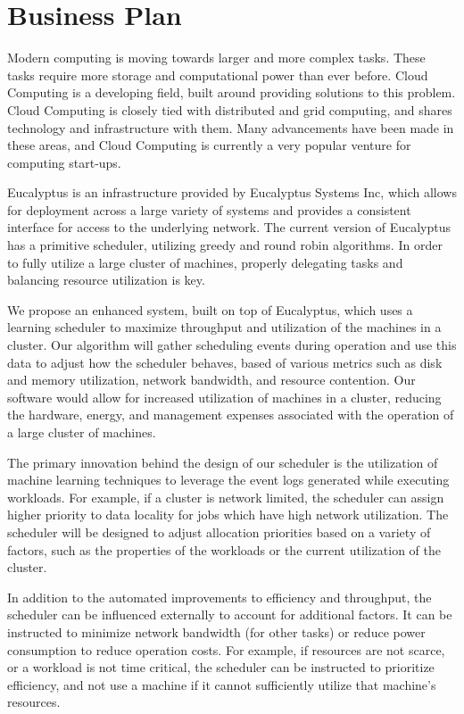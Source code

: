 \section{Business Plan}
  Modern computing is moving towards larger and more complex tasks.  These tasks require more storage and computational power than ever before.  Cloud Computing is a developing field, built around providing solutions to this problem.  Cloud Computing is closely tied with distributed and grid computing, and shares technology and infrastructure with them.  Many advancements have been made in these areas, and Cloud Computing is currently a very popular venture for computing start-ups.

  Eucalyptus is an infrastructure provided by Eucalyptus Systems Inc, which allows for deployment across a large variety of systems and provides a consistent interface for access to the underlying network.  The current version of Eucalyptus has a primitive scheduler, utilizing greedy and round robin algorithms.  In order to fully utilize a large cluster of machines, properly delegating tasks and balancing resource utilization is key.

  We propose an enhanced system, built on top of Eucalyptus, which uses a learning scheduler to maximize throughput and utilization of the machines in a cluster.  Our algorithm will gather scheduling events during operation and use this data to adjust how the scheduler behaves, based of various metrics such as disk and memory utilization, network bandwidth, and resource contention.  Our software would allow for increased utilization of machines in a cluster, reducing the hardware, energy, and management expenses associated with the operation of a large cluster of machines.

  The primary innovation behind the design of our scheduler is the utilization of machine learning techniques to leverage the event logs generated while executing workloads.  For example, if a cluster is network limited, the scheduler can assign higher priority to data locality for jobs which have high network utilization.  The scheduler will be designed to adjust allocation priorities based on a variety of factors, such as the properties of the workloads or the current utilization of the cluster.

  In addition to the automated improvements to efficiency and throughput, the scheduler can be influenced externally to account for additional factors.  It can be instructed to minimize network bandwidth (for other tasks) or reduce power consumption to reduce operation costs.  For example, if resources are not scarce, or a workload is not time critical, the scheduler can be instructed to prioritize efficiency, and not use a machine if it cannot sufficiently utilize that machine's resources.
